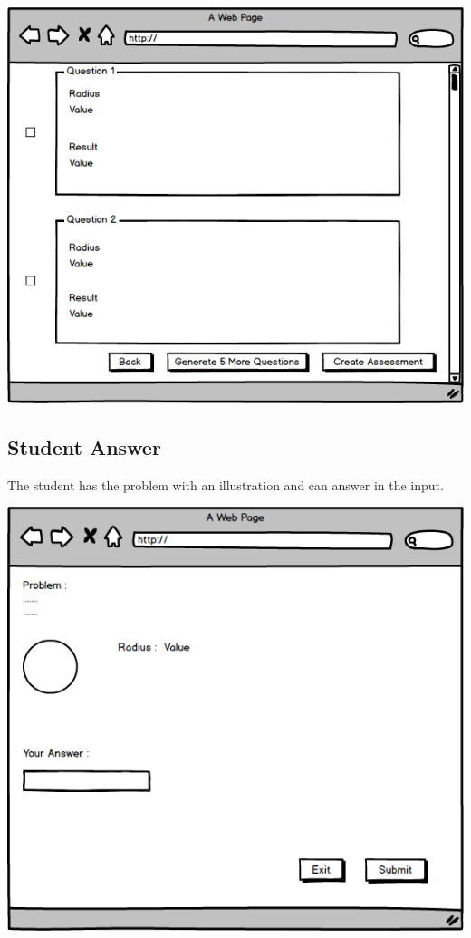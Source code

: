 \documentclass{article}
\begin{document}
\begin{center}
    \includegraphics[scale=0.5]{Questions_generated_choice.png}\\
\end{center}
\subsection{Student Answer}
The student has the problem with an illustration and can answer in the input.\\

\begin{center}
    \includegraphics[scale=0.5]{Student_Answer.png}\\
\end{center}
\newpage
\end{document}
